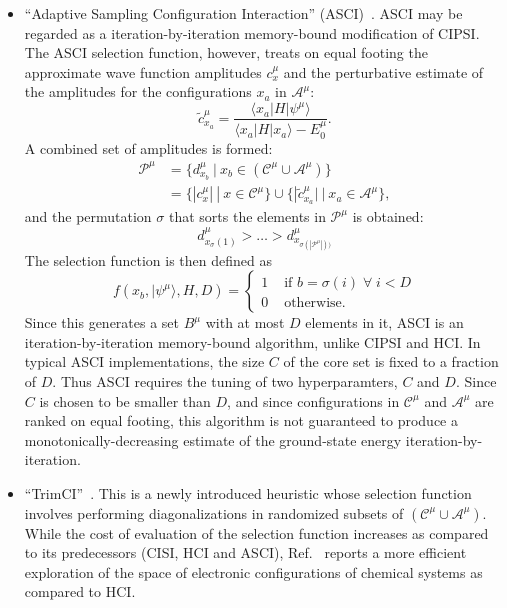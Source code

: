 \documentclass[
  reprint,            %
  amsmath,amssymb,
  aps,
  superscriptaddress, %
  longbibliography
]{revtex4-2}
\theoremstyle{definition}
\def\A{\mathcal{A}}
\def\C{\mathcal{C}}
\def\P{\mathcal{P}}
\begin{document}
\begin{itemize}
    \item ``Adaptive Sampling Configuration Interaction'' (ASCI)~\cite{tubman2016deterministic_SCI}. ASCI may be regarded as a iteration-by-iteration memory-bound modification of CIPSI. The ASCI selection function, however, treats on equal footing the approximate wave function amplitudes $c^\mu_x$ and the perturbative estimate of the amplitudes for the configurations $x_a$ in $\A^\mu$:
    \begin{equation}
    \label{asci_cf}
        \tilde{c}^\mu_{x_a} = \frac{\langle x_a | H | \psi^\mu\rangle}{\langle x_a | H | x_a\rangle-E^\mu_0}.
    \end{equation}
    A combined set of amplitudes is formed:
    \begin{equation}
    \begin{split}
        \P^\mu &= \{d^\mu_{x_b} \: | \: x_b \in (\C^\mu\cup \A^\mu) \} \\
        &= \{|c^\mu_x| \: | \: x \in \C^\mu \} \cup \{ |\tilde{c}^\mu_{x_a}| \: | \: x_a \in \A^\mu \},
    \end{split}
    \end{equation}
    and the permutation $\sigma$ that sorts the elements in $\P^\mu$ is obtained:
    \begin{equation}
        d^\mu_{x_\sigma(1)} > \hdots > d^\mu_{x_{\sigma(|\P^\mu|))}}
    \end{equation}
    The selection function is then defined as
    \begin{equation}
        f(x_b, |\psi^\mu\rangle, H, D) = 
        \begin{cases}
            1 & \textrm{ if } b = \sigma(i) \; \forall \; i< D \\
            0 & \textrm{ otherwise}.
        \end{cases}
    \end{equation}
    Since this generates a set $B^\mu$ with at most $D$ elements in it, ASCI is an iteration-by-iteration memory-bound algorithm, unlike CIPSI and HCI. In typical ASCI implementations, the size $C$ of the core set is fixed to a fraction of $D$. Thus ASCI requires the tuning of two hyperparamters, $C$ and $D$. Since $C$ is chosen to be smaller than $D$, and since configurations in $\C^\mu$ and $\A^\mu$ are ranked on equal footing, this algorithm is not guaranteed to produce a monotonically-decreasing estimate of the ground-state energy iteration-by-iteration. 

    \item ``TrimCI''~\cite{zhang2025TrimCI_SCI}. This is a newly introduced heuristic whose selection function involves performing diagonalizations in randomized subsets of $(\C^\mu\cup \A^\mu)$. While the cost of evaluation of the selection function increases as compared to its predecessors (CISI, HCI and ASCI), Ref.~\cite{zhang2025TrimCI_SCI} reports a more efficient exploration of the space of electronic configurations of chemical systems as compared to HCI.


\end{itemize}
\end{document}
